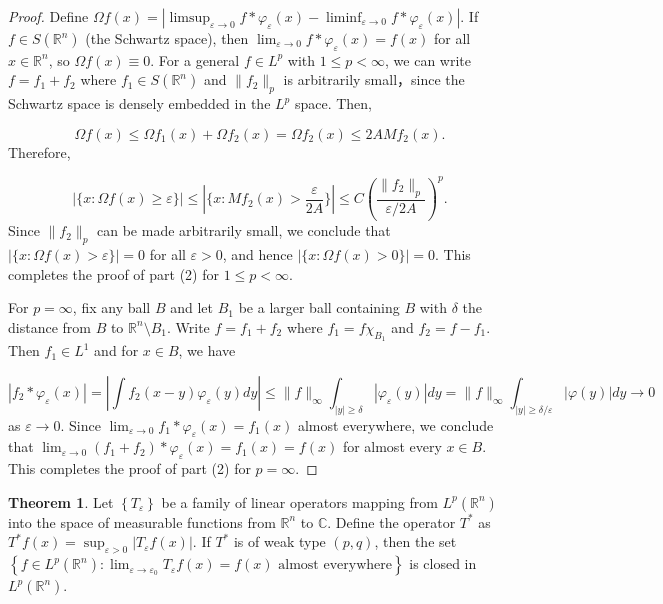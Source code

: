 \documentclass[12pt,openany]{book}
\theoremstyle{definition}
\newtheorem{theorem}{Theorem}[section]
\begin{document}
\begin{proof}
Define $\Omega f(x) = |\limsup_{\varepsilon \rightarrow 0} f * \varphi_{\varepsilon}(x) - \liminf_{\varepsilon \rightarrow 0} f * \varphi_{\varepsilon}(x)|$. If $f \in S(\mathbb{R}^n)$ (the Schwartz space), then $\lim_{\varepsilon \rightarrow 0} f * \varphi_{\varepsilon}(x) = f(x)$ for all $x \in \mathbb{R}^n$, so $\Omega f(x) \equiv 0$. For a general $f \in L^p$ with $1 \leqslant p < \infty$, we can write $f = f_1 + f_2$ where $f_1 \in S(\mathbb{R}^n)$ and $\|f_2\|_p$ is arbitrarily small，since the Schwartz space is densely embedded in the $L^p$ space. Then,

$$\Omega f(x) \leqslant \Omega f_1(x) + \Omega f_2(x) = \Omega f_2(x) \leqslant 2A Mf_2(x).$$Therefore,

$$|\{x: \Omega f(x) \geqslant \varepsilon\}| \leqslant |\{x: Mf_2(x) > \frac{\varepsilon}{2A}\}| \leqslant C \left(\frac{\|f_2\|_p}{\varepsilon / 2A}\right)^p.$$Since $\|f_2\|_p$ can be made arbitrarily small, we conclude that $|\{x: \Omega f(x) > \varepsilon\}| = 0$ for all $\varepsilon > 0$, and hence $|\{x: \Omega f(x) > 0\}| = 0$. This completes the proof of part (2) for $1 \leqslant p < \infty$.

For $p = \infty$, fix any ball $B$ and let $B_1$ be a larger ball containing $B$ with $\delta$ the distance from $B$ to $\mathbb{R}^n \setminus B_1$. Write $f = f_1 + f_2$ where $f_1 = f \chi_{B_1}$ and $f_2 = f - f_1$. Then $f_1 \in L^1$ and for $x \in B$, we have

$$|f_2 * \varphi_{\varepsilon}(x)| = \left|\int f_2(x-y) \varphi_{\varepsilon}(y) dy\right| \leqslant \|f\|_{\infty} \int_{|y| \geqslant \delta} |\varphi_{\varepsilon}(y)| dy = \|f\|_{\infty} \int_{|y| \geqslant \delta/\varepsilon} |\varphi(y)| dy \rightarrow 0$$as $\varepsilon \rightarrow 0$. Since $\lim_{\varepsilon \rightarrow 0} f_1 * \varphi_{\varepsilon}(x) = f_1(x)$ almost everywhere, we conclude that $\lim_{\varepsilon \rightarrow 0} (f_1 + f_2) * \varphi_{\varepsilon}(x) = f_1(x) = f(x)$ for almost every $x \in B$. This completes the proof of part (2) for $p = \infty$.
\end{proof}
\begin{theorem}
    Let $\left\{T_\varepsilon\right\}$ be a family of linear operators mapping from $L^p\left(\mathbb{R}^n\right)$ into the space of measurable functions from $\mathbb{R}^n$ to $\mathbb{C}$. Define the operator $T^*$ as $T^* f(x)=\sup _{\varepsilon>0}\left|T_{\varepsilon} f(x)\right|$. If $T^*$ is of weak type $(p, q)$, then the set $\left\{f \in L^p\left(\mathbb{R}^n\right): \lim _{\varepsilon \rightarrow \varepsilon_0} T_{\varepsilon} f(x)=f(x) \text{ almost everywhere}\right\}$ is closed in $L^p\left(\mathbb{R}^n\right)$.
\end{theorem}
\end{document}
